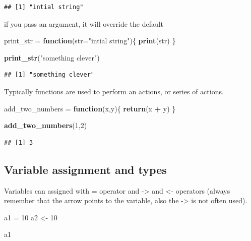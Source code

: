 \documentclass[]{book}
\newenvironment{Shaded}{\begin{snugshade}}{\end{snugshade}}
\newcommand{\ControlFlowTok}[1]{\textcolor[rgb]{0.13,0.29,0.53}{\textbf{#1}}}
\newcommand{\DataTypeTok}[1]{\textcolor[rgb]{0.13,0.29,0.53}{#1}}
\newcommand{\DecValTok}[1]{\textcolor[rgb]{0.00,0.00,0.81}{#1}}
\newcommand{\KeywordTok}[1]{\textcolor[rgb]{0.13,0.29,0.53}{\textbf{#1}}}
\newcommand{\NormalTok}[1]{#1}
\newcommand{\OperatorTok}[1]{\textcolor[rgb]{0.81,0.36,0.00}{\textbf{#1}}}
\newcommand{\StringTok}[1]{\textcolor[rgb]{0.31,0.60,0.02}{#1}}
\begin{document}
\begin{verbatim}
## [1] "intial string"
\end{verbatim}

if you pass an argument, it will override the default

\begin{Shaded}
\begin{Highlighting}[]
\NormalTok{print_str =}\StringTok{ }\ControlFlowTok{function}\NormalTok{(}\DataTypeTok{str=}\StringTok{"intial string"}\NormalTok{)\{}
\KeywordTok{print}\NormalTok{(str)}
\NormalTok{\}}

\KeywordTok{print_str}\NormalTok{(}\StringTok{"something clever"}\NormalTok{)}
\end{Highlighting}
\end{Shaded}

\begin{verbatim}
## [1] "something clever"
\end{verbatim}

Typically functions are used to perform an actions, or series of actions.

\begin{Shaded}
\begin{Highlighting}[]
\NormalTok{add_two_numbers =}\StringTok{ }\ControlFlowTok{function}\NormalTok{(x,y)\{}
  \KeywordTok{return}\NormalTok{(x }\OperatorTok{+}\StringTok{ }\NormalTok{y)}
\NormalTok{\}}

\KeywordTok{add_two_numbers}\NormalTok{(}\DecValTok{1}\NormalTok{,}\DecValTok{2}\NormalTok{)}
\end{Highlighting}
\end{Shaded}

\begin{verbatim}
## [1] 3
\end{verbatim}

\hypertarget{variable-assignment-and-types}{%
\subsection{Variable assignment and types}\label{variable-assignment-and-types}}

Variables can assigned with = operator and -\textgreater{} and \textless- operators (always remember that the arrow points to the variable, also the -\textgreater{} is not often used).

\begin{Shaded}
\begin{Highlighting}[]
\NormalTok{a1 =}\StringTok{ }\DecValTok{10}
\NormalTok{a2 <-}\StringTok{ }\DecValTok{10}

\NormalTok{a1}
\end{Highlighting}
\end{Shaded}
\end{document}
